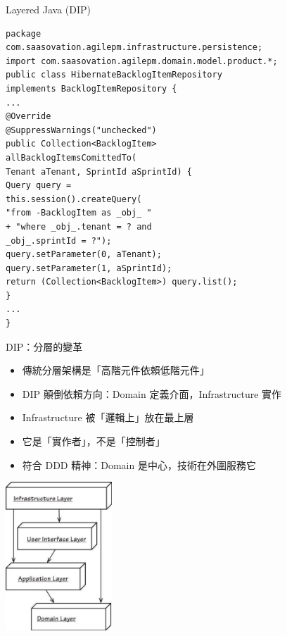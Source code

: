 \documentclass[UTF8]{beamer}
\begin{document}
\begin{frame}[fragile]{Layered Java (DIP)}
    \tiny
    \begin{lstlisting}
package
com.saasovation.agilepm.infrastructure.persistence;
import com.saasovation.agilepm.domain.model.product.*;
public class HibernateBacklogItemRepository
implements BacklogItemRepository {
...
@Override
@SuppressWarnings("unchecked")
public Collection<BacklogItem>
allBacklogItemsComittedTo(
Tenant aTenant, SprintId aSprintId) {
Query query =
this.session().createQuery(
"from -BacklogItem as _obj_ "
+ "where _obj_.tenant = ? and
_obj_.sprintId = ?");
query.setParameter(0, aTenant);
query.setParameter(1, aSprintId);
return (Collection<BacklogItem>) query.list();
}
...
}
\end{lstlisting}
\end{frame}

\begin{frame}{DIP：分層的變革}
    \begin{itemize}
        \item 傳統分層架構是「高階元件依賴低階元件」
        \item DIP 顛倒依賴方向：Domain 定義介面，Infrastructure 實作
        \item Infrastructure 被「邏輯上」放在最上層
        \item 它是「實作者」，不是「控制者」
        \item 符合 DDD 精神：Domain 是中心，技術在外圍服務它
    \end{itemize}
    \begin{center}
        \includegraphics[width=0.3\textwidth]{img/infra-calls-domain.png}
    \end{center}
\end{frame}

\end{document}
